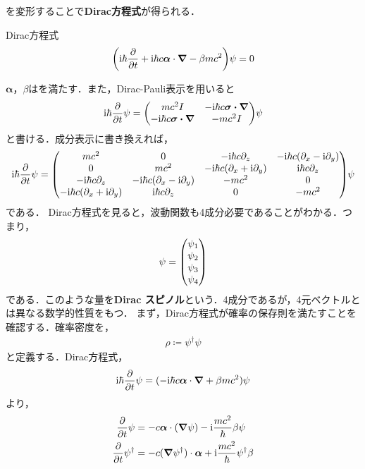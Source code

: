 \documentclass{report}
\begin{document}
    を変形することで\textbf{Dirac方程式}が得られる．
    \begin{itembox}[l]{Dirac方程式}
    \begin{align}
      \qty(\mathrm{i}\hbar \pdv{t} + \mathrm{i} \hbar c \bm{\alpha}\cdot \grad - \beta mc^2)\psi = 0
    \end{align}
    \end{itembox}
    $\bm{\alpha}$，$\beta$はを満たす．また，Dirac-Pauli表示を用いると
    \begin{align}
      \i\hbar \pdv{t}\psi = 
      \mqty(mc^2 I & -\i\hbar c\bm{\sigma\cdot\bm{\nabla} } \\ 
        -\i\hbar c\bm{\sigma\cdot\bm{\nabla} } & -mc^2 I
        )\psi
    \end{align}
    と書ける．成分表示に書き換えれば，
    \begin{align}
      \i\hbar\pdv{t}\psi =
      \mqty(
        mc^2 & 0 & -\i\hbar c\partial_z & -\i\hbar c(\partial_x - \i \partial_y)\\
        0 & mc^2 & -\i\hbar c(\partial_x + \i \partial_y) & \i\hbar c\partial_z \\
        -\i\hbar c\partial_z & -\i\hbar c(\partial_x - \i \partial_y) & -mc^2 & 0\\
        -\i\hbar c(\partial_x + \i \partial_y) & \i\hbar c\partial_z & 0 & -mc^2
      )
      \psi\label{dirac-eq-matrix}
    \end{align}
    である．
    Dirac方程式を見ると，波動関数も4成分必要であることがわかる．つまり，
    \begin{align}
      \psi = 
      \mqty(
        \psi_1\\\psi_2\\\psi_3\\\psi_4
      )
    \end{align}
    である．このような量を\textbf{Dirac スピノル}という．4成分であるが，4元ベクトルとは異なる数学的性質をもつ．
    まず，Dirac方程式が確率の保存則を満たすことを確認する．確率密度を，
    \begin{align}
      \rho \coloneqq \psi^{\dagger}\psi
    \end{align}
    と定義する．Dirac方程式，
    \begin{align}
      \mathrm{i}\hbar\pdv{t} \psi = (-\mathrm{i}\hbar c\bm{\alpha}\cdot \grad + \beta mc^2)\psi
    \end{align}
    より，
    \begin{align}
      \pdv{t}\psi &= -c \bm{\alpha} \cdot (\grad\psi) -\mathrm{i} \frac{mc^2}\hbar \beta\psi\\
      \pdv{t}\psi^{\dagger} &= -c(\grad\psi^{\dagger})\cdot \bm{\alpha} + \mathrm{i}\frac{mc^2}{\hbar}\psi^{\dagger}\beta
    \end{align}
\end{document}
